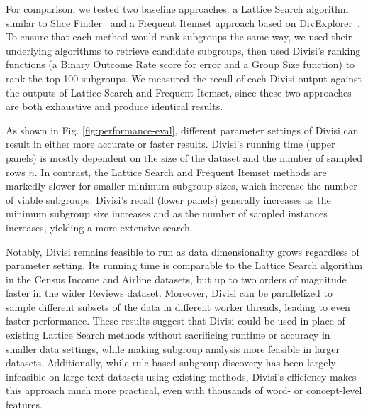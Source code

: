 For comparison, we tested two baseline approaches: a Lattice Search algorithm similar to Slice Finder~\cite{chung_slice_2020} and a Frequent Itemset approach based on DivExplorer~\cite{pastor_looking_2021}. 
To ensure that each method would rank subgroups the same way, we used their underlying algorithms to retrieve candidate subgroups, then used Divisi's ranking functions (a Binary Outcome Rate score for error and a Group Size function) to rank the top 100 subgroups.
We measured the recall of each Divisi output against the outputs of Lattice Search and Frequent Itemset, since these two approaches are both exhaustive and produce identical results.

As shown in Fig. \ref{fig:performance-eval}, different parameter settings of Divisi can result in either more accurate or faster results. Divisi's running time (upper panels) is mostly dependent on the size of the dataset and the number of sampled rows $n$. 
In contrast, the Lattice Search and Frequent Itemset methods are markedly slower for smaller minimum subgroup sizes, which increase the number of viable subgroups. 
Divisi's recall (lower panels) generally increases as the minimum subgroup size increases and as the number of sampled instances increases, yielding a more extensive search.

Notably, Divisi remains feasible to run as data dimensionality grows regardless of parameter setting.
Its running time is comparable to the Lattice Search algorithm in the Census Income and Airline datasets, but up to two orders of magnitude faster in the wider Reviews dataset.
Moreover, Divisi can be parallelized to sample different subsets of the data in different worker threads, leading to even faster performance.
These results suggest that Divisi could be used in place of existing Lattice Search methods without sacrificing runtime or accuracy in smaller data settings, while making subgroup analysis more feasible in larger datasets.
Additionally, while rule-based subgroup discovery has been largely infeasible on large text datasets using existing methods, Divisi's efficiency makes this approach much more practical, even with thousands of word- or concept-level features.